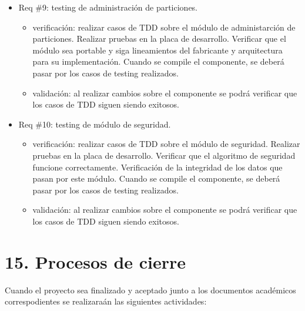 \documentclass[
11pt, %
]{charter}
\begin{document}
\begin{itemize} 
\item Req \#9: testing de administración de particiones.

\begin{itemize}
	\item verificación: realizar casos de TDD sobre el módulo de administarción de particiones. Realizar pruebas en la placa de desarrollo. Verificar que el módulo sea portable y siga lineamientos del fabricante y arquitectura para su implementación. Cuando se compile el componente, se deberá pasar por los casos de testing realizados.
	\item validación: al realizar cambios sobre el componente se podrá verificar que los casos de TDD siguen siendo exitosos.
\end{itemize}

\end{itemize}
\newpage

\begin{itemize} 
\item Req \#10: testing de módulo de seguridad.

\begin{itemize}
	\item verificación: realizar casos de TDD sobre el módulo de seguridad. Realizar pruebas en la placa de desarrollo. Verificar que el algoritmo de seguridad funcione correctamente. Verificación de la integridad de los datos que pasan por este módulo. Cuando se compile el componente, se deberá pasar por los casos de testing realizados.
	\item validación: al realizar cambios sobre el componente se podrá verificar que los casos de TDD siguen siendo exitosos.
\end{itemize}

\end{itemize}

\section{15. Procesos de cierre}    
\label{sec:cierre}

Cuando el proyecto sea finalizado y aceptado junto a los documentos académicos correspodientes se realizaraán las siguientes actividades:
\end{document}
